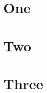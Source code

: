 \documentclass[11pt]{report}
\begin{document}
\tableofcontents
\chapter{One}\lipsum[1-60]
\chapter{Two}\lipsum[61-120]
\chapter{Three}\lipsum[1-100]
\end{document}
